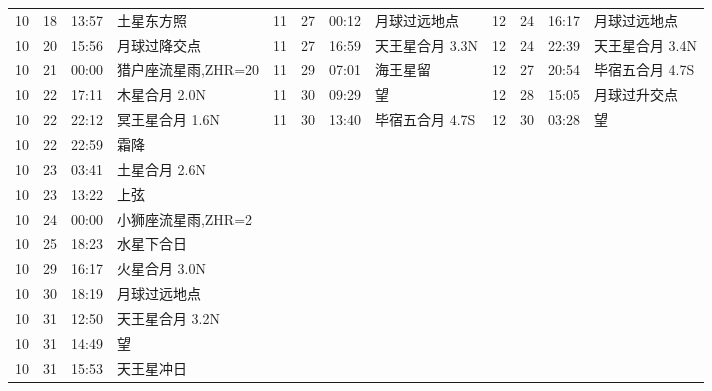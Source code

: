 \begin{tabular}{llll|llll|llll}
10 & 18 & 13:57 & 土星东方照 & 11 & 27 & 00:12 & 月球过远地点 & 12 & 24 & 16:17 & 月球过远地点 \tabularnewline
10 & 20 & 15:56 & 月球过降交点 & 11 & 27 & 16:59 & 天王星合月 3.3N & 12 & 24 & 22:39 & 天王星合月 3.4N \tabularnewline
10 & 21 & 00:00 & 猎户座流星雨,ZHR=20 & 11 & 29 & 07:01 & 海王星留 & 12 & 27 & 20:54 & 毕宿五合月 4.7S \tabularnewline
10 & 22 & 17:11 & 木星合月 2.0N & 11 & 30 & 09:29 & 望 & 12 & 28 & 15:05 & 月球过升交点 \tabularnewline
10 & 22 & 22:12 & 冥王星合月 1.6N & 11 & 30 & 13:40 & 毕宿五合月 4.7S & 12 & 30 & 03:28 & 望 \tabularnewline
10 & 22 & 22:59 & 霜降 &  &  &  &  &  &  &  &  \tabularnewline
10 & 23 & 03:41 & 土星合月 2.6N &  &  &  &  &  &  &  &  \tabularnewline
10 & 23 & 13:22 & 上弦 &  &  &  &  &  &  &  &  \tabularnewline
10 & 24 & 00:00 & 小狮座流星雨,ZHR=2 &  &  &  &  &  &  &  &  \tabularnewline
10 & 25 & 18:23 & 水星下合日 &  &  &  &  &  &  &  &  \tabularnewline
10 & 29 & 16:17 & 火星合月 3.0N &  &  &  &  &  &  &  &  \tabularnewline
10 & 30 & 18:19 & 月球过远地点 &  &  &  &  &  &  &  &  \tabularnewline
10 & 31 & 12:50 & 天王星合月 3.2N &  &  &  &  &  &  &  &  \tabularnewline
10 & 31 & 14:49 & 望 &  &  &  &  &  &  &  &  \tabularnewline
10 & 31 & 15:53 & 天王星冲日 &  &  &  &  &  &  &  &  \tabularnewline
\hline \end{tabular}
